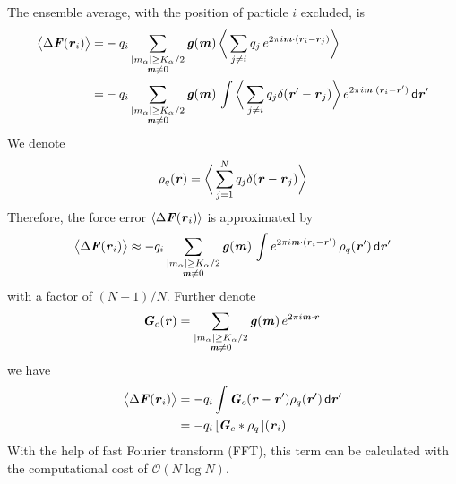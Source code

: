 \documentclass[aps,pre,preprint]{revtex4}
\renewcommand{\v}[1]{\textbf{\textit{#1}}}
\renewcommand{\d}[1]{\textsf{#1}}
\begin{document}
The ensemble average, with the position of particle $i$ excluded, is
\begin{align}\nonumber
  \big\langle
  \Delta \v F(\v r_i)
  \big\rangle
  = & - 
  q_i\sum_{
    \begin{subarray}{c}
      \vert m_\alpha\vert \geq K_\alpha/2\\
      \v m\neq 0
    \end{subarray}}
  \v g(\v m) \,
  \bigg\langle
  \sum_{j\neq i}q_j\,e^{2\pi i\v m\cdot(\v r_i - \v r_j)}
  \bigg\rangle\\\nonumber
  = & -
  q_i\sum_{
    \begin{subarray}{c}
      \vert m_\alpha\vert \geq K_\alpha/2\\
      \v m\neq 0
    \end{subarray}}
  \v g(\v m) \,
  \int
  \bigg\langle
  \sum_{j\neq i}
  q_j\delta(\v r' - \v r_j)
  \bigg\rangle
  \,e^{2\pi i\v m\cdot(\v r_i - \v r')}
  \,\d d\v r'
\end{align}
We denote
\begin{align}
  \rho_q(\v r) = 
  \bigg\langle
  \sum_{j = 1}^N
  q_j\delta(\v r - \v r_j)
  \bigg\rangle
\end{align}
Therefore, the force error $\langle\Delta \v F(\v r_i)\rangle$ is approximated by 
\begin{align}
  \big\langle
  \Delta \v F(\v r_i)
  \big\rangle
  \approx
  -q_i\sum_{
    \begin{subarray}{c}
      \vert m_\alpha\vert \geq K_\alpha/2\\
      \v m\neq 0
    \end{subarray}}
  \v g(\v m) \,
  \int
  e^{2\pi i\v m\cdot(\v r_i - \v r')}\,
  \rho_q(\v r')
  \,\d d\v r'
\end{align}
with a factor of $(N-1)/N$. Further denote
\begin{align}
  \v G_c(\v r) =
  \sum_{
    \begin{subarray}{c}
      \vert m_\alpha\vert \geq K_\alpha/2\\
      \v m\neq 0
    \end{subarray}}
  \v g(\v m) \,
  e^{2\pi i\v m\cdot\v r}\,
\end{align}
we have
\begin{align}
  \big\langle
  \Delta \v F(\v r_i)
  \big\rangle
  &=
  -q_i \int \v G_c(\v r - \v r') \rho_q(\v r')\,\d d\v r'\\
  &= 
  -q_i\,[\v G_c\ast\rho_q\,] (\v r_i)
\end{align}
With the help of fast Fourier transform (FFT), this term can be
calculated with the computational cost of $\mathcal O(N\log N)$.
\end{document}
